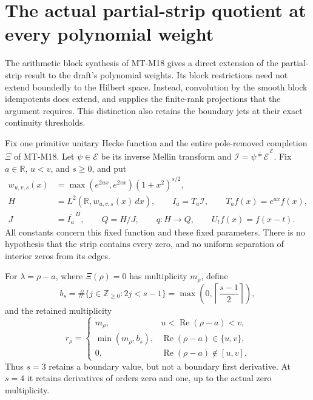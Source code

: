 \section{The actual partial-strip quotient at every polynomial weight}
\label{sec:weighted-partial-strip}

The arithmetic block synthesis of MT-M18 gives a direct extension
of the partial-strip result to the draft's polynomial weights.
Its block restrictions need not extend boundedly to the Hilbert
space. Instead, convolution by the smooth block idempotents does
extend, and supplies the finite-rank projections that the argument
requires. This distinction also retains the boundary jets at their
exact continuity thresholds.

Fix one primitive unitary Hecke function and the entire
pole-removed completion $\Xi$ of MT-M18. Let $\psi\in\mathcal E$
be its inverse Mellin transform and
$\mathcal I=\overline{\psi*\mathcal E}^{\,\mathcal E}$.
Fix $a\in\mathbb R$, $u<v$, and $s\ge0$, and put
\[
 \begin{aligned}
 w_{u,v,s}(x)&=\max(e^{2ux},e^{2vx})(1+x^2)^{s/2},\\
 H&=L^2(\mathbb R,w_{u,v,s}(x)\,dx),\qquad
 I_a=T_a\mathcal I,\qquad T_af(x)=e^{ax}f(x),\\
 J&=\overline{I_a}^{\,H},\qquad Q=H/J,\qquad
 q:H\longrightarrow Q,\qquad U_tf(x)=f(x-t).
 \end{aligned}
 \tag{MA-WP.1}
\]
All constants concern this fixed function and these fixed parameters.
There is no hypothesis that the strip contains every zero, and no
uniform separation of interior zeros from its edges.

For $\lambda=\rho-a$, where $\Xi(\rho)=0$ has multiplicity
$m_\rho$, define
\[
 b_s=\#\{j\in\mathbb Z_{\ge0}:2j<s-1\}
     =\max\left(0,\left\lceil\frac{s-1}{2}\right\rceil\right),
 \tag{MA-WP.2}
\]
and the retained multiplicity
\[
 r_\rho=
 \begin{cases}
 m_\rho,&u<\operatorname{Re}(\rho-a)<v,\\
 \min(m_\rho,b_s),&\operatorname{Re}(\rho-a)\in\{u,v\},\\
 0,&\operatorname{Re}(\rho-a)\notin[u,v].
 \end{cases}
 \tag{MA-WP.3}
\]
Thus $s=3$ retains a boundary value, but not a boundary first
derivative. At $s=4$ it retains derivatives of orders zero and one,
up to the actual zero multiplicity.


